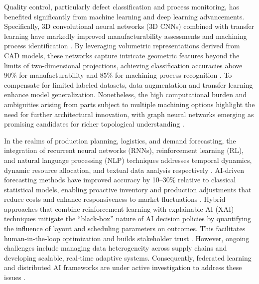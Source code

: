 \documentclass[sigconf]{acmart}
\begin{document}
Quality control, particularly defect classification and process monitoring, has benefited significantly from machine learning and deep learning advancements. Specifically, 3D convolutional neural networks (3D CNNs) combined with transfer learning have markedly improved manufacturability assessments and machining process identification \cite{ref39}. By leveraging volumetric representations derived from CAD models, these networks capture intricate geometric features beyond the limits of two-dimensional projections, achieving classification accuracies above 90\% for manufacturability and 85\% for machining process recognition \cite{ref39}. To compensate for limited labeled datasets, data augmentation and transfer learning enhance model generalization. Nonetheless, the high computational burden and ambiguities arising from parts subject to multiple machining options highlight the need for further architectural innovation, with graph neural networks emerging as promising candidates for richer topological understanding \cite{ref39}.

In the realms of production planning, logistics, and demand forecasting, the integration of recurrent neural networks (RNNs), reinforcement learning (RL), and natural language processing (NLP) techniques addresses temporal dynamics, dynamic resource allocation, and textual data analysis respectively \cite{ref40}. AI-driven forecasting methods have improved accuracy by 10–30\% relative to classical statistical models, enabling proactive inventory and production adjustments that reduce costs and enhance responsiveness to market fluctuations \cite{ref40,ref45}. Hybrid approaches that combine reinforcement learning with explainable AI (XAI) techniques mitigate the “black-box” nature of AI decision policies by quantifying the influence of layout and scheduling parameters on outcomes. This facilitates human-in-the-loop optimization and builds stakeholder trust \cite{ref45}. However, ongoing challenges include managing data heterogeneity across supply chains and developing scalable, real-time adaptive systems. Consequently, federated learning and distributed AI frameworks are under active investigation to address these issues \cite{ref40}.
\end{document}
